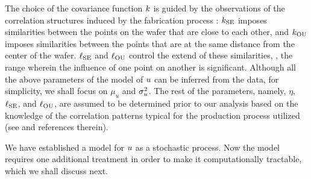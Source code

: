 The choice of the covariance function $\fCov$ is guided by the observations of the correlation structures induced by the fabrication process \cite{chandrakasan2001, cheng2011}: $\fCov_\SE$ imposes similarities between the points on the wafer that are close to each other, and $\fCov_\OU$ imposes similarities between the points that are at the same distance from the center of the wafer.
$\ell_{\text{SE}}$ and $\ell_{\text{OU}}$ control the extend of these similarities, \ie, the range wherein the influence of one point on another is significant.
Although all the above parameters of the model of $u$ can be inferred from the data, for simplicity, we shall focus on $\mu_u$ and $\sigma_u^2$.
The rest of the parameters, namely, $\eta$, $\ell_{\text{SE}}$, and $\ell_{\text{OU}}$, are assumed to be determined prior to our analysis based on the knowledge of the correlation patterns typical for the production process utilized (see \cite{marzouk2009} and references therein).

We have established a model for $u$ as a stochastic process.
Now the model requires one additional treatment in order to make it computationally tractable, which we shall discuss next.


